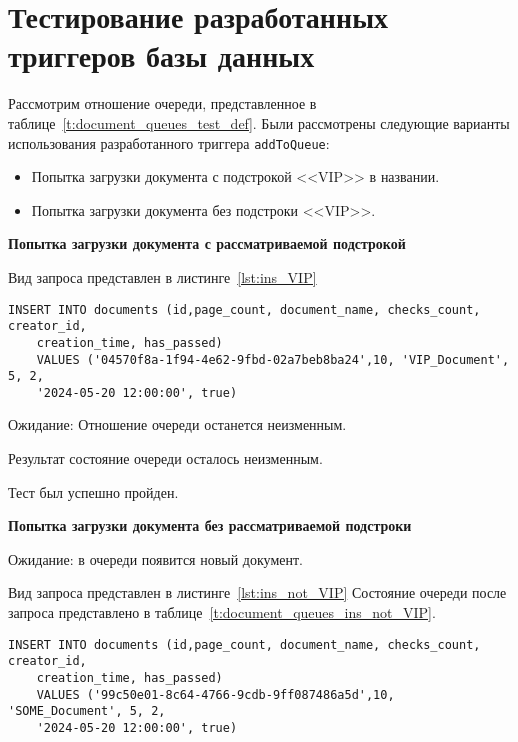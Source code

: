 \section{Тестирование разработанных триггеров базы данных}
Рассмотрим отношение очереди, представленное в
таблице~\ref{t:document_queues_test_def}.
Были рассмотрены следующие варианты использования разработанного триггера
\texttt{addToQueue}:
\begin{itemize}
	\item Попытка загрузки документа с подстрокой <<VIP>> в названии.
	\item Попытка загрузки документа  без подстроки <<VIP>>.
\end{itemize}

\textbf{Попытка загрузки документа с рассматриваемой подстрокой}

Вид запроса представлен в листинге~\ref{lst:ins_VIP}
\begin{lstlisting}[caption=Запрос загрузки документа с подстрокой
	<<VIP>>,frame=tlrb,label=lst:ins_VIP]
	INSERT INTO documents (id,page_count, document_name, checks_count, creator_id,
	creation_time, has_passed)
	VALUES ('04570f8a-1f94-4e62-9fbd-02a7beb8ba24',10, 'VIP_Document', 5, 2,
	'2024-05-20 12:00:00', true)
\end{lstlisting}

Ожидание: Отношение очереди останется неизменным.

Результат состояние очереди осталось неизменным.

Тест был успешно пройден.

\textbf{Попытка загрузки документа без рассматриваемой подстроки}

Ожидание: в очереди появится новый документ.

Вид запроса представлен в листинге~\ref{lst:ins_not_VIP}
Состояние очереди после запроса представлено в
таблице~\ref{t:document_queues_ins_not_VIP}.
\newpage
\begin{lstlisting}[caption=Запрос загрузки документа без подстоки
	<<VIP>>,frame=tlrb,label=lst:ins_not_VIP]
	INSERT INTO documents (id,page_count, document_name, checks_count, creator_id,
	creation_time, has_passed)
	VALUES ('99c50e01-8c64-4766-9cdb-9ff087486a5d',10, 'SOME_Document', 5, 2,
	'2024-05-20 12:00:00', true)
\end{lstlisting}

